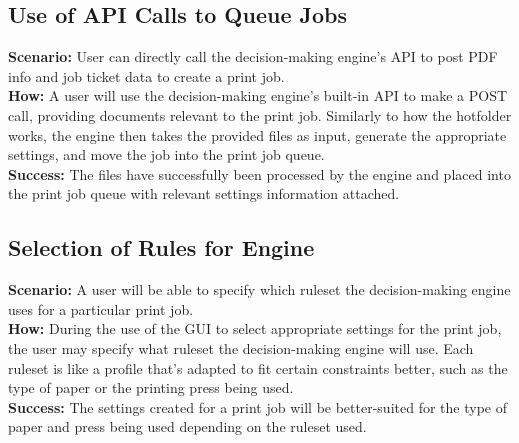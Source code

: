 \documentclass[onecolumn, draftclsnofoot,10pt, compsoc]{IEEEtran}
\begin{document}

\subsection{Use of API Calls to Queue Jobs}
\textbf{Scenario:} User can directly call the decision-making engine's API to post PDF info and job ticket data to create a print job.\\
\textbf{How:} A user will use the decision-making engine's built-in API to make a POST call, providing documents relevant to the print job. Similarly to how the hotfolder works, the engine then takes the provided files as input, generate the appropriate settings, and move the job into the print job queue.\\
\textbf{Success:} The files have successfully been processed by the engine and placed into the print job queue with relevant settings information attached.

\pagebreak

\subsection{Selection of Rules for Engine}
\textbf{Scenario:} A user will be able to specify which ruleset the decision-making engine uses for a particular print job.\\
\textbf{How:} During the use of the GUI to select appropriate settings for the print job, the user may specify what ruleset the decision-making engine will use. Each ruleset is like a profile that's adapted to fit certain constraints better, such as the type of paper or the printing press being used.\\
\textbf{Success:} The settings created for a print job will be better-suited for the type of paper and press being used depending on the ruleset used.
\end{document}
